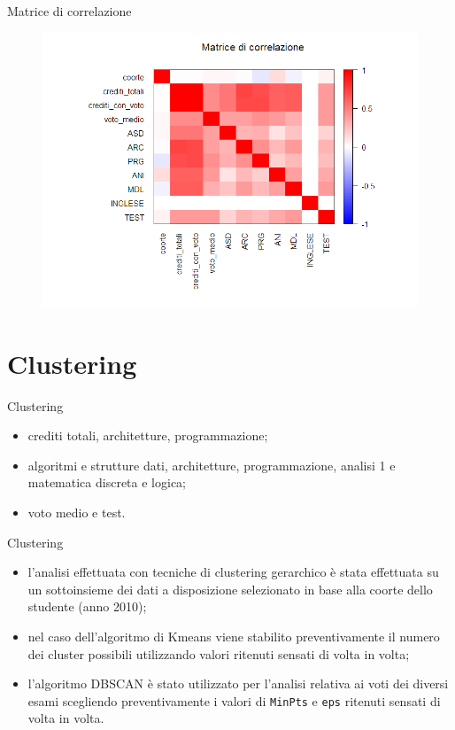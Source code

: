 \documentclass{beamer}
\begin{document}
\begin{frame}{Matrice di correlazione}
  \begin{figure}[bt]
    \begin{center}
      \includegraphics[width=\textwidth]{../img/corMatrix.png}
    \end{center}
  \end{figure}
\end{frame}

\section{Clustering}

\begin{frame}{Clustering}
  \begin{itemize}
    \item crediti totali, architetture, programmazione;
    \item algoritmi e strutture dati, architetture, programmazione, analisi 1 e matematica discreta e logica;
    \item voto medio e test.
  \end{itemize}
\end{frame}

\begin{frame}{Clustering}
  \begin{itemize}
    \item l'analisi effettuata con tecniche di clustering gerarchico è stata effet\-tuata su un sottoinsieme dei dati a disposizione selezionato in base alla coorte dello studente (anno 2010);
    \item nel caso dell'algoritmo di Kmeans viene stabilito preventivamente il numero dei cluster possibili utilizzando valori ritenuti sensati di volta in volta;
    \item l'algoritmo DBSCAN è stato utilizzato per l'analisi relativa ai voti dei diversi esami scegliendo preventivamente i valori di \texttt{MinPts} e \texttt{eps} ritenuti sensati di volta in volta.
  \end{itemize}
\end{frame}
\end{document}
